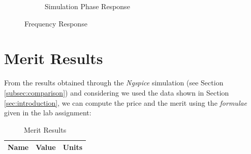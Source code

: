 \begin{figure}[h]
\begin{subfigure}{.5\textwidth}
    \caption{Simulation Phase Response}
\end{subfigure}
\caption{Frequency Response}
\label{fig:freq_resp}
\end{figure}

\clearpage

\section{Merit Results}
\label{sec:merit}

From the results obtained through the \textit{Ngspice} simulation (see Section \ref{subsec:comparison}) and considering we used the data shown in Section \ref{sec:introduction}, we can compute the price and the merit using the \textit{formulae} given in the lab assignment:

\begin{table}[h]
    \centering
    \begin{tabular}{|l|c|c|}
    \hline
    {\bf Name} & {\bf Value} & {\bf Units} \\ \hline
    
   \end{tabular}
   \caption{Merit Results}
   \label{tab:merit}
\end{table}
